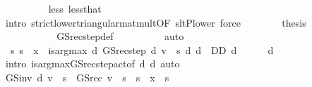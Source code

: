 \begin{isabellebody}
\ \ \ \ \ \ \ \ \isamarkupfalse%
\ less{\isacharparenleft}{\kern0pt}{}{\isacharparenright}{\kern0pt}\ less{\isacharparenleft}{\kern0pt}{}{\isacharparenright}{\kern0pt}that\isanewline
\ \ \ \ \ \ \ \ \isamarkupfalse%
\ {\isacharparenleft}{\kern0pt}intro\ strict{\isacharunderscore}{\kern0pt}lower{\isacharunderscore}{\kern0pt}triangular{\isacharunderscore}{\kern0pt}mat{\isacharunderscore}{\kern0pt}mult{\isacharbrackleft}{\kern0pt}OF\ slt{\isacharunderscore}{\kern0pt}P{\isacharunderscore}{\kern0pt}lower{\isacharbrackright}{\kern0pt}{\isacharparenright}{\kern0pt}\ force\isanewline
\ \ \ \ \ \ \isamarkupfalse%
\ {\isacharquery}{\kern0pt}thesis\ \isanewline
\ \ \ \ \ \ \ \ \isamarkupfalse%
\ {\isacharasterisk}{\kern0pt}\isanewline
\ \ \ \ \ \ \ \ \isamarkupfalse%
\ GS{\isacharunderscore}{\kern0pt}rec{\isacharunderscore}{\kern0pt}step{\isacharunderscore}{\kern0pt}def\isanewline
\ \ \ \ \ \ \ \ \isamarkupfalse%
\ auto\isanewline
\ \ \ \ \isamarkupfalse%
\isanewline
\ \ \isamarkupfalse%
\isanewline
\ \ \isamarkupfalse%
\ {\isacharasterisk}{\kern0pt}{\isacharcolon}{\kern0pt}\ {\isachardoublequoteopen}{\isasymAnd}s{\isachardot}{\kern0pt}\ s\ {\isasymle}\ x\ {\isasymLongrightarrow}\ is{\isacharunderscore}{\kern0pt}arg{\isacharunderscore}{\kern0pt}max\ {\isacharparenleft}{\kern0pt}{\isasymlambda}d{\isachardot}{\kern0pt}\ GS{\isacharunderscore}{\kern0pt}rec{\isacharunderscore}{\kern0pt}step\ d\ v\ {\isachardollar}{\kern0pt}\ s{\isacharparenright}{\kern0pt}\ {\isacharparenleft}{\kern0pt}{\isasymlambda}d{\isachardot}{\kern0pt}\ d\ {\isasymin}\ D\isactrlsub D{\isacharparenright}{\kern0pt}\ d{\isachardoublequoteclose}\isanewline
\ \ \ \ \isamarkupfalse%
\ d\isanewline
\ \ \ \ \isamarkupfalse%
\ {\isacharparenleft}{\kern0pt}intro\ is{\isacharunderscore}{\kern0pt}arg{\isacharunderscore}{\kern0pt}max{\isacharunderscore}{\kern0pt}GS{\isacharunderscore}{\kern0pt}rec{\isacharunderscore}{\kern0pt}step{\isacharunderscore}{\kern0pt}act{\isacharprime}{\kern0pt}{\isacharbrackleft}{\kern0pt}of\ d\ d{\isacharbrackright}{\kern0pt}{\isacharparenright}{\kern0pt}\ auto\isanewline
\ \ \isamarkupfalse%
\ \isamarkupfalse%
\ {\isachardoublequoteopen}GS{\isacharunderscore}{\kern0pt}inv\ d\ v\ {\isachardollar}{\kern0pt}\ s\ {\isacharequal}{\kern0pt}\ GS{\isacharunderscore}{\kern0pt}rec\ v\ {\isachardollar}{\kern0pt}\ s{\isachardoublequoteclose}\ \ {\isachardoublequoteopen}s\ {\isasymle}\ x{\isachardoublequoteclose}\ \ s\isanewline

\end{isabellebody}
